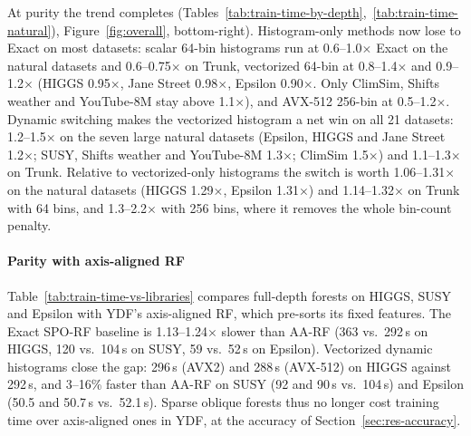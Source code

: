 \documentclass[sigconf]{acmart}%
\begin{document}
At purity the trend completes (Tables~\ref{tab:train-time-by-depth},~\ref{tab:train-time-natural}), Figure~\ref{fig:overall}, bottom-right). Histogram-only methods now lose to Exact on most datasets: scalar 64-bin histograms run at 0.6--1.0$\times$ Exact on the natural datasets and 0.6--0.75$\times$ on Trunk, vectorized 64-bin at 0.8--1.4$\times$ and 0.9--1.2$\times$ (HIGGS 0.95$\times$, Jane Street 0.98$\times$, Epsilon 0.90$\times$. Only ClimSim, Shifts weather and YouTube-8M stay above 1.1$\times$), and AVX-512 256-bin at 0.5--1.2$\times$. Dynamic switching makes the vectorized histogram a net win on all 21 datasets: 1.2--1.5$\times$ on the seven large natural datasets (Epsilon, HIGGS and Jane Street 1.2$\times$; SUSY, Shifts weather and YouTube-8M 1.3$\times$; ClimSim 1.5$\times$) and 1.1--1.3$\times$ on Trunk. Relative to vectorized-only histograms the switch is worth 1.06--1.31$\times$ on the natural datasets (HIGGS 1.29$\times$, Epsilon 1.31$\times$) and 1.14--1.32$\times$ on Trunk with 64 bins, and 1.3--2.2$\times$ with 256 bins, where it removes the whole bin-count penalty.

\paragraph{Parity with axis-aligned RF} Table~\ref{tab:train-time-vs-libraries} compares full-depth forests on HIGGS, SUSY and Epsilon with YDF's axis-aligned RF, which pre-sorts its fixed features. The Exact SPO-RF baseline is 1.13--1.24$\times$ slower than AA-RF (363 vs.\ 292\,s on HIGGS, 120 vs.\ 104\,s on SUSY, 59 vs.\ 52\,s on Epsilon). Vectorized dynamic histograms close the gap: 296\,s (AVX2) and 288\,s (AVX-512) on HIGGS against 292\,s, and 3--16\% faster than AA-RF on SUSY (92 and 90\,s vs.\ 104\,s) and Epsilon (50.5 and 50.7\,s vs.\ 52.1\,s). Sparse oblique forests thus no longer cost training time over axis-aligned ones in YDF, at the accuracy of Section~\ref{sec:res-accuracy}.


\end{document}
